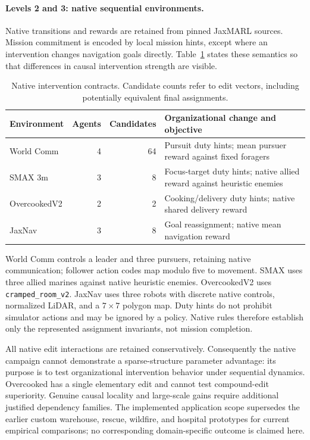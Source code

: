 \documentclass[runningheads]{llncs}
\begin{document}
\paragraph{Levels 2 and 3: native sequential environments.}
Native transitions and rewards are retained from pinned JaxMARL sources. Mission commitment is encoded by local mission hints, except where an intervention changes navigation goals directly. Table~\ref{tab:environments} states these semantics so that differences in causal intervention strength are visible.
\begin{table}[t]
    \caption{Native intervention contracts. Candidate counts refer to edit vectors, including potentially equivalent final assignments.}\label{tab:environments}
    \small\begin{tabularx}{\textwidth}{@{}lrrX@{}}\toprule
        Environment  & Agents & Candidates & Organizational change and objective                                     \\\midrule
        World Comm   & 4      & 64         & Pursuit duty hints; mean pursuer reward against fixed foragers          \\
        SMAX 3m      & 3      & 8          & Focus-target duty hints; native allied reward against heuristic enemies \\
        OvercookedV2 & 2      & 2          & Cooking/delivery duty hints; native shared delivery reward              \\
        JaxNav       & 3      & 8          & Goal reassignment; native mean navigation reward                        \\\bottomrule
    \end{tabularx}\end{table}
World Comm controls a leader and three pursuers, retaining native communication; follower action codes map modulo five to movement. SMAX uses three allied marines against native heuristic enemies. OvercookedV2 uses \texttt{cramped\_room\_v2}. JaxNav uses three robots with discrete native controls, normalized LiDAR, and a $7\times7$ polygon map. Duty hints do not prohibit simulator actions and may be ignored by a policy. Native rules therefore establish only the represented assignment invariants, not mission completion.

All native edit interactions are retained conservatively. Consequently the native campaign cannot demonstrate a sparse-structure parameter advantage: its purpose is to test organizational intervention behavior under sequential dynamics. Overcooked has a single elementary edit and cannot test compound-edit superiority. Genuine causal locality and large-scale gains require additional justified dependency families. The implemented application scope supersedes the earlier custom warehouse, rescue, wildfire, and hospital prototypes for current empirical comparisons; no corresponding domain-specific outcome is claimed here.
\end{document}

